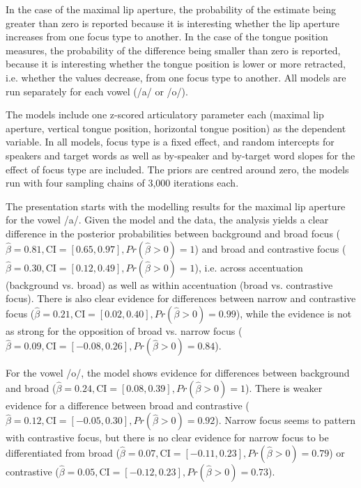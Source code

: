 In the case of the maximal lip aperture, the probability of the estimate being greater than zero is reported because it is interesting whether the lip aperture increases from one focus type to another. In the case of the tongue position measures, the probability of the difference being smaller than zero is reported, because it is interesting  whether the tongue position is lower or more retracted, i.e. whether the values decrease, from one focus type to another. All models are run separately for each vowel (/a/ or /o/).

The models include one z-scored articulatory parameter each (maximal lip aperture, vertical tongue position, horizontal tongue position) as the dependent variable. In all models, focus type is a fixed effect, and random intercepts for speakers and target words as well as by-speaker and by-target word slopes for the effect of focus type are included. The priors are centred around zero, the models run with four sampling chains of 3,000 iterations each.

The presentation starts with the modelling results for the maximal lip aperture for the vowel /a/. Given the model and the data, the analysis yields a clear difference in the posterior probabilities between background and broad focus ($\hat\beta=0.81 , \text{CI}=[0.65, 0.97], \allowbreak Pr(\hat\beta>0)=1$) and broad and contrastive focus ($\hat\beta=0.30 , \text{CI}=[0.12, 0.49], \allowbreak Pr(\hat\beta>0)=1$), i.e. across accentuation (background vs. broad) as well as within accentuation (broad vs. contrastive focus). There is also clear evidence for differences between narrow and contrastive focus ($\hat\beta=0.21 , \text{CI}=[0.02, 0.40], \allowbreak Pr(\hat\beta>0)=0.99$), while the evidence is not as strong for the opposition of broad vs. narrow focus ($\hat\beta=0.09 , \text{CI}=\allowbreak[-0.08, 0.26], \allowbreak Pr(\hat\beta>0)=0.84$).

For the vowel /o/, the model shows evidence for differences between background and broad ($\hat\beta=0.24 , \text{CI}=[0.08, 0.39], \allowbreak Pr(\hat\beta>0)=1$). There is weaker evidence for a difference between broad and contrastive ($\hat\beta=0.12, \text{CI}=[-0.05, 0.30], \allowbreak Pr(\hat\beta>0)=0.92$). Narrow focus seems to pattern with contrastive focus, but there is no clear evidence for narrow focus to be differentiated from broad ($\hat\beta=0.07 , \text{CI}=[-0.11, 0.23], \allowbreak Pr(\hat\beta>0)=0.79$) or contrastive ($\hat\beta=0.05, \text{CI}=[-0.12, \allowbreak 0.23], \allowbreak Pr(\hat\beta>0)=0.73$). 

